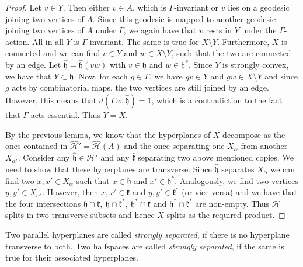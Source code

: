\begin{proof}
  Let \(v \in Y\). Then either \(v \in A\), which is \(\Gamma\)-invariant or \(v\) lies on a geodesic joining two vertices of \(A\). Since this geodesic is mapped to another geodesic joining two vertices of \(A\) under \(\Gamma\), we again have that \(v\) rests in \(Y\) under the \(\Gamma\)-action. All in all \(Y\) is \(\Gamma\)-invariant. The same is true for \(X \setminus Y\). Furthermore, \(X\) is connected and we can find \(v \in Y\) and \(w \in X \setminus Y\), such that the two are connected by an edge. Let \(\mathfrak{\hat h} = \mathfrak{\hat h}(vw)\) with \(v \in \mathfrak{h}\) and \(w \in \mathfrak{h}^\ast\). Since \(Y\) is strongly convex, we have that \(Y \subset \mathfrak{h}\). Now, for each \(g \in \Gamma\), we have \(gv \in Y\) and \(gw \in X \setminus Y\) and since \(g\) acts by combinatorial maps, the two vertices are still joined by an edge. However, this means that \(d(\Gamma w, \mathfrak{\hat h}) = 1\), which is a contradiction to the fact that \(\Gamma\) acts essential. Thus \(Y = X\).

  By the previous lemma, we know that the hyperplanes of \(X\) decompose as the ones contained in \(\mathcal{\hat H'} = \mathcal{\hat H}(A)\) and the once separating one \(X_\alpha\) from another \(X_{\alpha'}\). Consider any \(\mathfrak{\hat h} \in \mathcal{\hat H'}\) and any \(\mathfrak{\hat k}\) separating two above mentioned copies. We need to show that these hyperplanes are transverse. Since \(\mathfrak{\hat h}\) separates \(X_\alpha\) we can find two \(x, x' \in X_\alpha\) such that \(x \in \mathfrak{h}\) and \(x' \in \mathfrak{h}^\ast\). Analogously, we find two vertices \(y,y' \in X_{\alpha'}\). However, then \(x,x' \in \mathfrak{k}\) and \(y,y' \in \mathfrak{k}^\ast\) (or vice versa) and we have that the four intersections \(\mathfrak{h} \cap \mathfrak{k},\ \mathfrak{h} \cap \mathfrak{k}^\ast,\ \mathfrak{h}^\ast \cap \mathfrak{k}\) and \(\mathfrak{h}^\ast \cap \mathfrak{k}^\ast\) are non-empty. Thus \(\mathcal{H}\) splits in two transverse subsets and hence \(X\) splits as the required product.
\end{proof}

\begin{defin}
  Two parallel hyperplanes are called \emph{strongly separated}, if there is no hyperplane transverse to both. Two halfspaces are called \emph{strongly separated}, if the same is true for their associated hyperplanes.
\end{defin}

